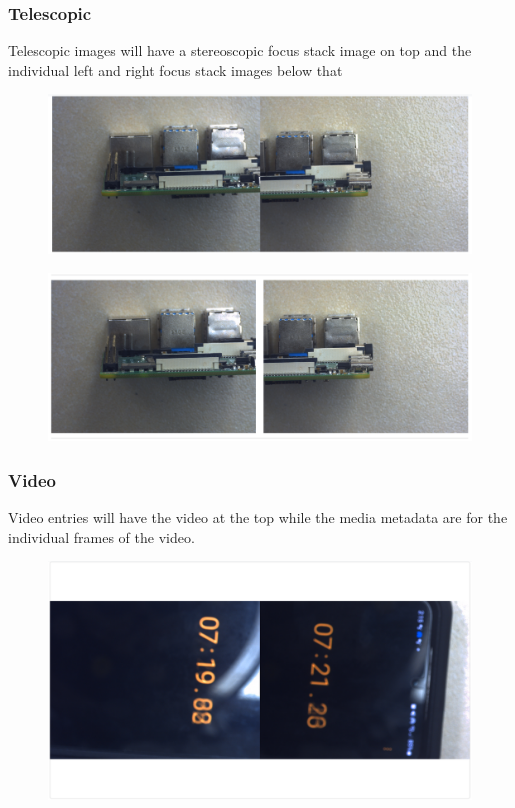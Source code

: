 \documentclass[12pt]{article}
\begin{document}
\begin{center}
	\subsubsection{Telescopic}
	Telescopic images will have a stereoscopic focus stack image on top and the individual left and right focus stack images below that
	\begin{figure}[H]
		\includegraphics[width=\textwidth]{Figures/Stereo-Telescopic-Image.png}
	\end{figure}
	\begin{figure}[H]
		\includegraphics[width=\textwidth]{Figures/L-R-Telescopic-Image.png}
	\end{figure}
	\subsubsection{Video}
	Video entries will have the video at the top while the media metadata are for the individual frames of the video.
	\begin{figure}[H]
		\includegraphics[width=\textwidth]{Figures/Video.png}
	\end{figure}

\end{center}
\end{document}
